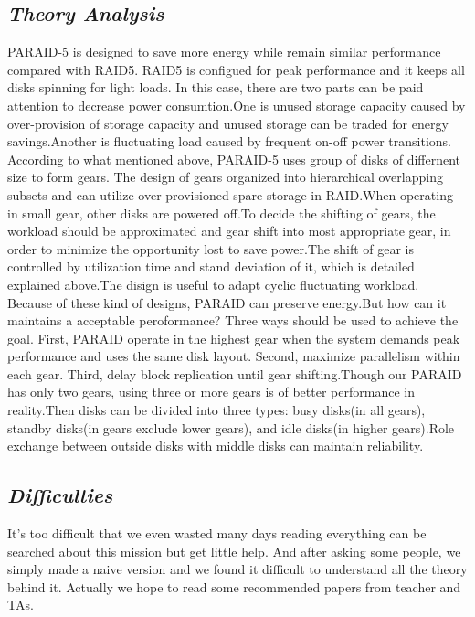 \documentclass[conference]{IEEEtran}
\begin{document}
\subsection{\emph{\textbf{Theory Analysis}}}
    \begin{flushleft}
\quad   PARAID-5 is designed to save more energy while remain similar performance compared with RAID5. RAID5 is configued for peak performance and it keeps all disks spinning for light loads. In this case, there are two parts can be paid attention to decrease power consumtion.One is unused storage capacity caused by over-provision of storage capacity and unused storage can be traded for energy savings.Another is fluctuating load caused by frequent on-off power transitions.\\
\quad   According to what mentioned above, PARAID-5 uses group of disks of differnent size to form gears. The design of gears organized into hierarchical overlapping subsets and can utilize over-provisioned spare storage in RAID.When operating in small gear, other disks are powered off.To decide the shifting of gears, the workload should be approximated and gear shift into most appropriate gear, in order to minimize the opportunity lost to save power.The shift of gear is controlled by utilization time and stand deviation of it, which is detailed explained above.The disign is useful to adapt cyclic fluctuating workload.\\
\quad   Because of these kind of designs, PARAID can preserve energy.But how can it maintains a acceptable peroformance? Three ways should be used to achieve the goal. First, PARAID operate in the highest gear when the system demands peak performance and uses the same disk layout. Second, maximize parallelism within each gear. Third, delay block replication until gear shifting.Though our PARAID has only two gears, using three or more gears is of better performance in reality.Then disks can be divided into three types: busy disks(in all gears), standby disks(in gears exclude lower gears), and idle disks(in higher gears).Role exchange between outside disks with middle disks can maintain reliability.
    \end{flushleft}

\subsection{\emph{\textbf{Difficulties}}}
It's too difficult that we even wasted many days reading everything can be searched about this mission but get little help. And after asking some people, we simply made a naive version and we found it difficult to understand all the theory behind it. Actually we hope to read some recommended papers from teacher and TAs. 
\end{document}
